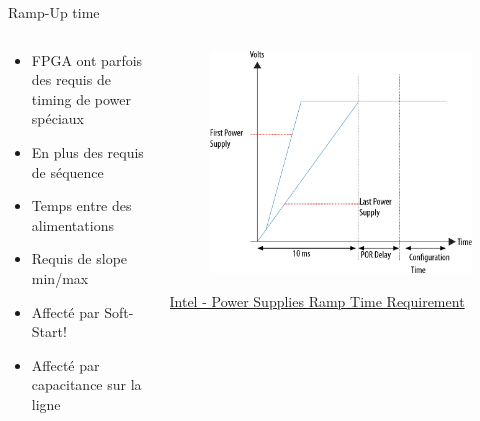 \begin{frame}{Ramp-Up time}
    \begin{columns}
        \begin{column}{0.5\textwidth}
            \begin{itemize}
                \item FPGA ont parfois des requis de timing de power spéciaux
                \item En plus des requis de séquence
                \item Temps entre des alimentations
                \item Requis de slope min/max
                \bigskip
                \item Affecté par Soft-Start!
                \item Affecté par capacitance sur la ligne
            \end{itemize}
        \end{column}
        \begin{column}{0.5\textwidth}
            \begin{figure}
                \includegraphics[width=\textwidth, height=\textheight, keepaspectratio]{pictures/power-supply-ramp-up.png}
            \end{figure}
            \vspace{-8pt}
            \href{https://www.intel.com/content/www/us/en/docs/programmable/683889/current/fpga-power-supplies-ramp-time-requirement.html}{Intel - Power Supplies Ramp Time Requirement}
        \end{column}
    \end{columns}
\end{frame}

